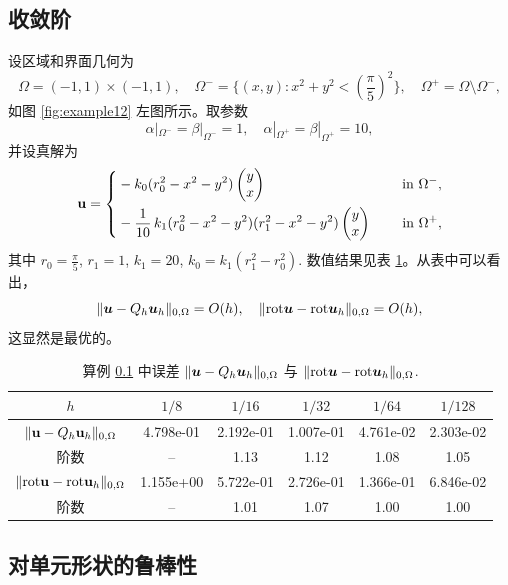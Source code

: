 \subsection{收敛阶}
\label{subsec:examp1}
设区域和界面几何为
$$
\Omega = (-1, 1)\times(-1, 1), \quad \Omega^- = \{(x, y): x^2+y^2 < \left(\frac{\pi}{5}\right)^2\}, \quad \Omega^+ = \Omega\setminus\Omega^-,
$$
如图 \ref{fig:example12} 左图所示。取参数
$$
\alpha|_{\Omega^-} = \beta|_{\Omega^-} = 1,\quad \alpha|_{\Omega^+} = \beta|_{\Omega^+} = 10,
$$
并设真解为
$$
{\bf u} = \left\{
\begin{aligned}
& - k_0(r_0^2 - x^2 - y^2)
\begin{pmatrix}
y\\
x
\end{pmatrix} \quad& \text{ in } \Omega^-, \\
& -\frac{1}{10} \, k_1(r_0^2 - x^2 - y^2)(r_1^2 - x^2 - y^2)
\begin{pmatrix}
y\\
x
\end{pmatrix} \quad& \text{ in } \Omega^+,
\end{aligned}
\right.
$$
其中 $r_0 = \frac{\pi}{5}$, $r_1 = 1$, $k_1 = 20$, $k_0 = k_1(r_1^2 - r_0^2)$.
数值结果见表 \ref{tab:exm0}。从表中可以看出，
$$
\|\boldsymbol{u} - Q_h \boldsymbol{u}_h\|_{0,\Omega} = O(h),\quad \|\mathrm{rot} \boldsymbol{u} - \mathrm{rot}\boldsymbol{u}_h\|_{0,\Omega} = O(h),
$$
这显然是最优的。

\begin{table}[!htp]
\centering
\caption{算例 \ref{subsec:examp1} 中误差 $\|\boldsymbol{u} - Q_h \boldsymbol{u}_h\|_{0,\Omega}$ 与
$\|\mathrm{rot} \boldsymbol{u} - \mathrm{rot} \boldsymbol{u}_h\|_{0,\Omega}$.}
\label{tab:exm0}
\begin{tabular}[c]{|c|c|c|c|c|c|}
\hline
$h$ & $1/8$ & $1/16$ & $1/32$ & $1/64$ & $1/128$ \\\hline
$\| {\bf u} - Q_h{\bf u}_h \|_{0,\Omega}$ & 4.798e-01 & 2.192e-01 & 1.007e-01 & 4.761e-02 & 2.303e-02 \\\hline
阶数 & -- & 1.13 & 1.12 & 1.08 & 1.05 \\\hline
$\|\mathrm{rot} {\bf u} - \mathrm{rot} {\bf u}_h\|_{0,\Omega}$ & 1.155e+00 & 5.722e-01 & 2.726e-01 & 1.366e-01 & 6.846e-02 \\\hline
阶数 & -- & 1.01 & 1.07 & 1.00 & 1.00 \\\hline
\end{tabular}
\end{table}

\subsection{对单元形状的鲁棒性}
\label{subsec:examp2}

